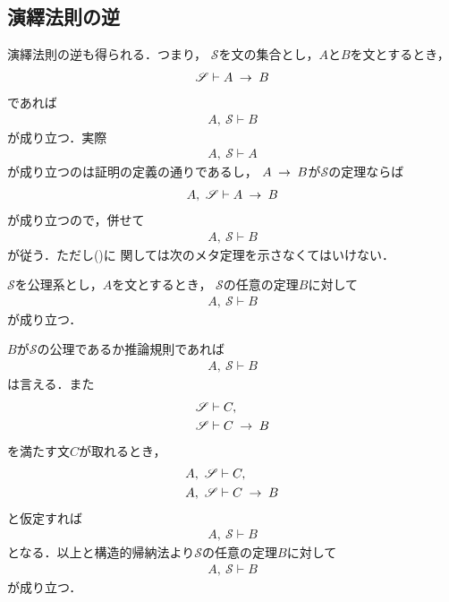 \subsection{演繹法則の逆}
	演繹法則の逆も得られる．つまり，
	$\mathscr{S}$を文の集合とし，$A$と$B$を文とするとき，
	\begin{align}
		\mathscr{S} \vdash A \hspace{0.25em}\rightarrow\hspace{0.25em} B
	\end{align}
	であれば
	\begin{align}
		A,\ \mathscr{S} \vdash B
	\end{align}
	が成り立つ．実際
	\begin{align}
		A,\ \mathscr{S} \vdash A
	\end{align}
	が成り立つのは証明の定義の通りであるし，
	$A \hspace{0.25em}\rightarrow\hspace{0.25em} B$が$\mathscr{S}$の定理ならば
	\begin{align}
		A,\ \mathscr{S} \vdash A \hspace{0.25em}\rightarrow\hspace{0.25em} B
		\label{fom:inversion_of_deduction_theorem}
	\end{align}
	が成り立つので，併せて
	\begin{align}
		A,\ \mathscr{S} \vdash B
	\end{align}
	が従う．ただし()に
	関しては次のメタ定理を示さなくてはいけない．
	
	\begin{screen}
		\begin{metathm}[公理が増えても証明可能]
			$\mathscr{S}$を公理系とし，$A$を文とするとき，
			$\mathscr{S}$の任意の定理$B$に対して
			\begin{align}
				A,\ \mathscr{S} \vdash B
			\end{align}
			が成り立つ．
		\end{metathm}
	\end{screen}
	
	\begin{metaprf}
		$B$が$\mathscr{S}$の公理であるか推論規則であれば
		\begin{align}
			A,\ \mathscr{S} \vdash B
		\end{align}
		は言える．また
		\begin{align}
			\mathscr{S} &\vdash C, \\
			\mathscr{S} &\vdash C \hspace{0.25em}\rightarrow\hspace{0.25em} B
		\end{align}
		を満たす文$C$が取れるとき，
		\begin{align}
			A,\ \mathscr{S} &\vdash C, \\
			A,\ \mathscr{S} &\vdash C \hspace{0.25em}\rightarrow\hspace{0.25em} B
		\end{align}
		と仮定すれば
		\begin{align}
			A,\ \mathscr{S} \vdash B
		\end{align}
		となる．以上と構造的帰納法より$\mathscr{S}$の任意の定理$B$に対して
		\begin{align}
			A,\ \mathscr{S} \vdash B
		\end{align}
		が成り立つ．
		\QED
	\end{metaprf}